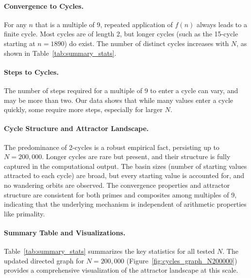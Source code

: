 \documentclass[12pt]{article}
\begin{document}
\paragraph{Convergence to Cycles.}
For any $n$ that is a multiple of 9, repeated application of $f(n)$ always leads to a finite cycle. Most cycles are of length 2, but longer cycles (such as the 15-cycle starting at $n=1890$) do exist. The number of distinct cycles increases with $N$, as shown in Table~\ref{tab:summary_stats}.

\paragraph{Steps to Cycles.}
The number of steps required for a multiple of 9 to enter a cycle can vary, and may be more than two. Our data shows that while many values enter a cycle quickly, some require more steps, especially for larger $N$.

\paragraph{Cycle Structure and Attractor Landscape.}
The predominance of 2-cycles is a robust empirical fact, persisting up to $N=200,000$. Longer cycles are rare but present, and their structure is fully captured in the computational output. The basin sizes (number of starting values attracted to each cycle) are broad, but every starting value is accounted for, and no wandering orbits are observed. The convergence properties and attractor structure are consistent for both primes and composites among multiples of 9, indicating that the underlying mechanism is independent of arithmetic properties like primality.

\paragraph{Summary Table and Visualizations.}
Table~\ref{tab:summary_stats} summarizes the key statistics for all tested $N$. The updated directed graph for $N=200,000$ (Figure~\ref{fig:cycles_graph_N200000}) provides a comprehensive visualization of the attractor landscape at this scale.
\end{document}
